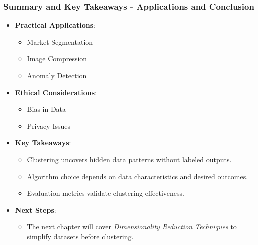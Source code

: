 \documentclass[aspectratio=169]{beamer}
\begin{document}
\begin{frame}[fragile]
    \frametitle{Summary and Key Takeaways - Applications and Conclusion}
    \begin{itemize}
        \item \textbf{Practical Applications}:
        \begin{itemize}
            \item Market Segmentation
            \item Image Compression
            \item Anomaly Detection
        \end{itemize}
        
        \item \textbf{Ethical Considerations}:
        \begin{itemize}
            \item Bias in Data
            \item Privacy Issues
        \end{itemize}

        \item \textbf{Key Takeaways}:
        \begin{itemize}
            \item Clustering uncovers hidden data patterns without labeled outputs.
            \item Algorithm choice depends on data characteristics and desired outcomes.
            \item Evaluation metrics validate clustering effectiveness.
        \end{itemize}
        
        \item \textbf{Next Steps}:
        \begin{itemize}
            \item The next chapter will cover \textit{Dimensionality Reduction Techniques} to simplify datasets before clustering.
        \end{itemize}
    \end{itemize}
\end{frame}
\end{document}
